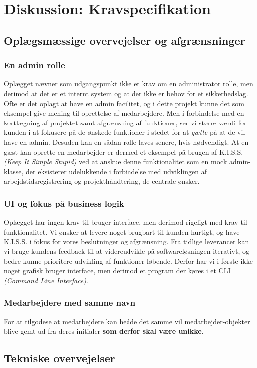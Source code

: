 \section{Diskussion: Kravspecifikation}
\subsection{Oplægsmæssige overvejelser og afgrænsninger}
\subsubsection{En admin rolle}
Oplægget nævner som udgangspunkt ikke et krav om en administrator rolle, men derimod at det er et internt system og at der ikke er behov for et sikkerhedslag. Ofte er det oplagt at have en admin facilitet, og i dette projekt kunne det som eksempel give mening til oprettelse af medarbejdere. Men i forbindelse med en kortlægning af projektet samt afgrænsning af funktioner, ser vi større værdi for kunden i at fokusere på de ønskede funktioner i stedet for at \textit{gætte} på at de vil have en admin. Desuden kan en sådan rolle laves senere, hvis nødvendigt. At en gæst kan oprette en medarbejder er dermed et eksempel på brugen af K.I.S.S. \textit{(Keep It Simple Stupid)} ved at anskue denne funktionalitet som en mock admin-klasse, der eksisterer udelukkende i forbindelse med udviklingen af arbejdstidsregistrering og projekthåndtering, de centrale ønsker.
\subsubsection{UI og fokus på business logik}
Oplægget har ingen krav til bruger interface, men derimod rigeligt med krav til funktionalitet. Vi ønsker at levere noget brugbart til kunden hurtigt, og have K.I.S.S. i fokus for vores beslutninger og afgrænsning. Fra tidlige leverancer kan vi bruge kundens feedback til at videreudvikle på softwareløsningen iterativt, og bedre kunne prioritere udvikling af funktioner løbende. Derfor har vi i første ikke noget grafisk bruger interface, men derimod et program der køres i et CLI \textit{(Command Line Interface)}.
\subsubsection{Medarbejdere med samme navn}
For at tilgodese at medarbejdere kan hedde det samme vil medarbejder-objekter blive gemt ud fra deres initialer \textbf{som derfor skal være unikke}.
\subsection{Tekniske overvejelser}
